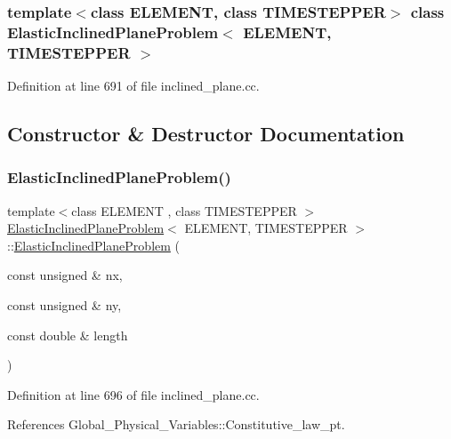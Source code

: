 \subsubsection*{template$<$class E\+L\+E\+M\+E\+NT, class T\+I\+M\+E\+S\+T\+E\+P\+P\+ER$>$\newline
class Elastic\+Inclined\+Plane\+Problem$<$ E\+L\+E\+M\+E\+N\+T, T\+I\+M\+E\+S\+T\+E\+P\+P\+E\+R $>$}



Definition at line 691 of file inclined\+\_\+plane.\+cc.



\subsection{Constructor \& Destructor Documentation}
\mbox{\label{classElasticInclinedPlaneProblem_a5006b73d91fcb4bd20d0591577e50f61}} 
\subsubsection{\texorpdfstring{Elastic\+Inclined\+Plane\+Problem()}{ElasticInclinedPlaneProblem()}}
{\footnotesize\ttfamily template$<$class E\+L\+E\+M\+E\+NT , class T\+I\+M\+E\+S\+T\+E\+P\+P\+ER $>$ \\
\hyperlink{classElasticInclinedPlaneProblem}{Elastic\+Inclined\+Plane\+Problem}$<$ E\+L\+E\+M\+E\+NT, T\+I\+M\+E\+S\+T\+E\+P\+P\+ER $>$\+::\hyperlink{classElasticInclinedPlaneProblem}{Elastic\+Inclined\+Plane\+Problem} (\begin{DoxyParamCaption}\item[{const unsigned \&}]{nx,  }\item[{const unsigned \&}]{ny,  }\item[{const double \&}]{length }\end{DoxyParamCaption})\hspace{0.3cm}{\ttfamily [inline]}}



Definition at line 696 of file inclined\+\_\+plane.\+cc.



References Global\+\_\+\+Physical\+\_\+\+Variables\+::\+Constitutive\+\_\+law\+\_\+pt.



